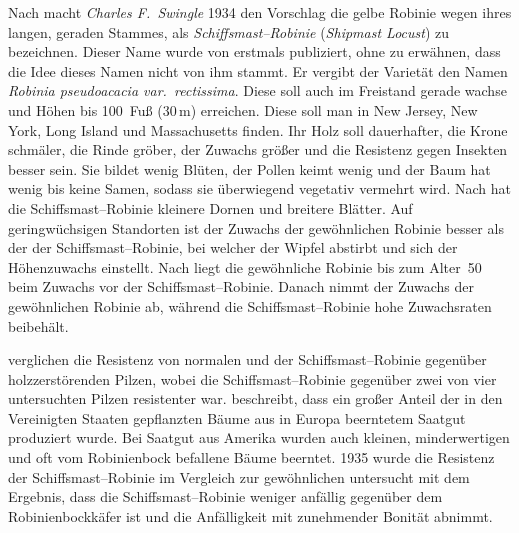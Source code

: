 \documentclass[twocolumn]{scrartcl}
\begin{document}
Nach \cite{detwiler1937robinie} macht \emph{Charles F.\ Swingle} 1934
den Vorschlag die gelbe Robinie wegen ihres langen, geraden Stammes,
als \emph{Schiffsmast--Robinie} (\emph{Shipmast Locust}) zu
bezeichnen. Dieser Name wurde von \cite{raber1936shipmast} erstmals
publiziert, ohne zu erwähnen, dass die Idee dieses Namen nicht von ihm
stammt. Er vergibt der Varietät den Namen \emph{Robinia pseudoacacia
var.\ rectissima}. Diese soll auch im Freistand gerade wachse und
Höhen bis 100~Fuß (30\,m) erreichen. Diese soll man in New Jersey, New
York, Long Island und Massachusetts finden. Ihr Holz soll dauerhafter,
die Krone schmäler, die Rinde gröber, der Zuwachs größer und die
Resistenz gegen Insekten besser sein. Sie bildet wenig Blüten, der
Pollen keimt wenig und der Baum hat wenig bis keine Samen, sodass sie
überwiegend vegetativ vermehrt wird.
Nach \cite{hopp1941robinieUnterschied} hat die
Schiffsmast--Robinie kleinere Dornen und breitere Blätter. Auf
geringwüchsigen Standorten ist der Zuwachs der gewöhnlichen Robinie
besser als der der Schiffsmast--Robinie, bei welcher der Wipfel
abstirbt und sich der Höhenzuwachs einstellt.
Nach \cite{hopp1947robinie} liegt die gewöhnliche Robinie bis zum Alter~50
beim Zuwachs vor der
Schiffsmast--Robinie. Danach nimmt der Zuwachs der gewöhnlichen
Robinie ab, während die Schiffsmast--Robinie hohe Zuwachsraten
beibehält.

\cite{hirt1938robinie,toole1938robinie} verglichen die
Resistenz von normalen und der Schiffsmast--Robinie gegenüber
holzzerstörenden Pilzen, wobei die Schiffsmast--Robinie gegenüber zwei
von vier untersuchten Pilzen resistenter war.
\cite{hall1937robinie} beschreibt, dass ein großer Anteil der in den
Vereinigten Staaten gepflanzten Bäume aus in Europa beerntetem Saatgut
produziert wurde. Bei Saatgut aus Amerika wurden auch kleinen,
minderwertigen und oft vom Robinienbock befallene Bäume
beerntet. 1935 wurde die Resistenz der Schiffsmast--Robinie im
Vergleich zur gewöhnlichen untersucht mit dem Ergebnis, dass die
Schiffsmast--Robinie weniger anfällig gegenüber dem Robinienbockkäfer
ist und die Anfälligkeit mit zunehmender Bonität abnimmt.
\end{document}
